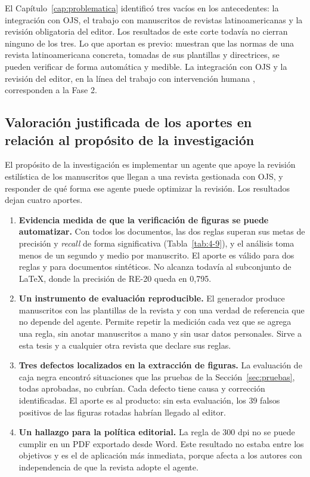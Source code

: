 El Capítulo~\ref{cap:problematica} identificó tres vacíos en los antecedentes: la integración con OJS, el trabajo con manuscritos de revistas latinoamericanas y la revisión obligatoria del editor. Los resultados de este corte todavía no cierran ninguno de los tres. Lo que aportan es previo: muestran que las normas de una revista latinoamericana concreta, tomadas de sus plantillas y directrices, se pueden verificar de forma automática y medible. La integración con OJS y la revisión del editor, en la línea del trabajo con intervención humana \cite{ref20}, corresponden a la Fase 2.


\subsection{Valoración justificada de los aportes en relación al propósito de la investigación}

El propósito de la investigación es implementar un agente que apoye la revisión estilística de los manuscritos que llegan a una revista gestionada con OJS, y responder de qué forma ese agente puede optimizar la revisión. Los resultados dejan cuatro aportes.

\begin{enumerate}
  \item \textbf{Evidencia medida de que la verificación de figuras se puede automatizar.} Con todos los documentos, las dos reglas superan sus metas de precisión y \emph{recall} de forma significativa (Tabla~\ref{tab:4-9}), y el análisis toma menos de un segundo y medio por manuscrito. El aporte es válido para dos reglas y para documentos sintéticos. No alcanza todavía al subconjunto de LaTeX, donde la precisión de RE-20 queda en 0,795.
  \item \textbf{Un instrumento de evaluación reproducible.} El generador produce manuscritos con las plantillas de la revista y con una verdad de referencia que no depende del agente. Permite repetir la medición cada vez que se agrega una regla, sin anotar manuscritos a mano y sin usar datos personales. Sirve a esta tesis y a cualquier otra revista que declare sus reglas.
  \item \textbf{Tres defectos localizados en la extracción de figuras.} La evaluación de caja negra encontró situaciones que las pruebas de la Sección~\ref{sec:pruebas}, todas aprobadas, no cubrían. Cada defecto tiene causa y corrección identificadas. El aporte es al producto: sin esta evaluación, los 39 falsos positivos de las figuras rotadas habrían llegado al editor.
  \item \textbf{Un hallazgo para la política editorial.} La regla de 300 dpi no se puede cumplir en un PDF exportado desde Word. Este resultado no estaba entre los objetivos y es el de aplicación más inmediata, porque afecta a los autores con independencia de que la revista adopte el agente.
\end{enumerate}

